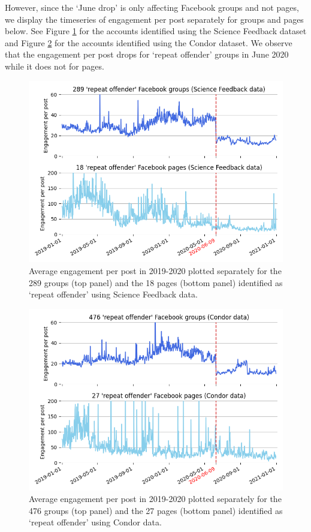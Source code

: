 \documentclass[review]{elsarticle}
\begin{document}
{{However, since the `June drop’ is only affecting Facebook groups and not pages, we display the timeseries of engagement per post separately for groups and pages below. See Figure \ref{engagement_groups_and_pages_sf} for the accounts identified using the Science Feedback dataset and Figure \ref{engagement_groups_and_pages_condor} for the accounts identified using the Condor dataset. 
We observe that the engagement per post drops for `repeat offender' groups in June 2020 while it does not for pages.

\begin{figure}[!h]
\centering
\includegraphics[scale=0.5]{./../figure/supplementary_engagement_groups_and_pages_sf.png}
\caption{
Average engagement per post in 2019-2020 plotted separately for the 289 groups (top panel) and the 18 pages (bottom panel) identified as `repeat offender' using Science Feedback data.
}
\label{engagement_groups_and_pages_sf}
\end{figure}

\begin{figure}[!h]
\centering
\includegraphics[scale=0.5]{./../figure/supplementary_engagement_groups_and_pages_condor.png}
\caption{
Average engagement per post in 2019-2020 plotted separately for the 476 groups (top panel) and the 27 pages (bottom panel) identified as `repeat offender' using Condor data.
}
\label{engagement_groups_and_pages_condor}
\end{figure}

}}
\end{document}
